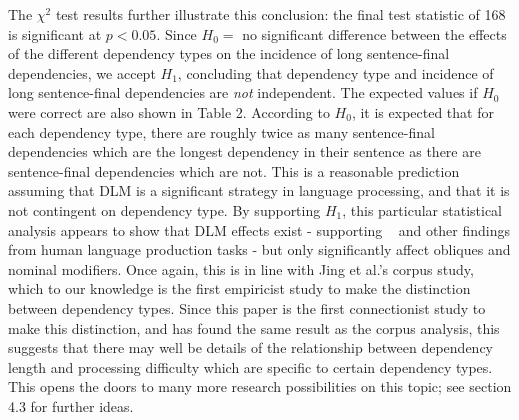\documentclass{article}
\begin{document}
The $\chi^2$ test results further illustrate this conclusion: the final test statistic of 168 is significant at $p < 0.05$. Since $H_0 =$ no significant difference between the effects of the different dependency types on the incidence of long sentence-final dependencies, we accept $H_1$, concluding that dependency type and incidence of long sentence-final dependencies are \textit{not} independent. The expected values if $H_0$ were correct are also shown in Table 2. According to $H_0$, it is expected that for each dependency type, there are roughly twice as many sentence-final dependencies which are the longest dependency in their sentence as there are sentence-final dependencies which are not. This is a reasonable prediction assuming that DLM is a significant strategy in language processing, and that it is not contingent on dependency type. By supporting $H_1$, this particular statistical analysis appears to show that DLM effects exist - supporting ~\cite{stallings1998} and other findings from human language production tasks - but only significantly affect obliques and nominal modifiers. Once again, this is in line with Jing et al.'s corpus study, which to our knowledge is the first empiricist study to make the distinction between dependency types. Since this paper is the first connectionist study to make this distinction, and has found the same result as the corpus analysis, this suggests that there may well be details of the relationship between dependency length and processing difficulty which are specific to certain dependency types. This opens the doors to many more research possibilities on this topic; see section 4.3 for further ideas.
\end{document}
